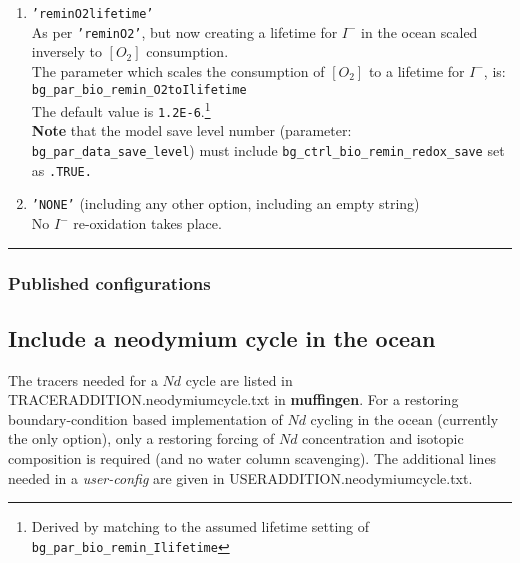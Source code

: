\begin{itemize}[noitemsep]
\begin{enumerate}[noitemsep]
\vspace{1mm}
\item \texttt{'reminO2lifetime'}
\vspace{1mm}
\\As per \texttt{'reminO2'}, but now creating a lifetime for \(I^{-}\) in the ocean scaled inversely to \([O_{2}]\) consumption.
\vspace{1mm}
\\The parameter which scales the consumption of \([O_{2}]\) to a lifetime for \(I^{-}\), is: \\\texttt{bg\_par\_bio\_remin\_O2toIlifetime}
\vspace{1mm}
\\The default value is \texttt{1.2E-6}.\footnote{Derived by matching to the assumed lifetime setting of \texttt{bg\_par\_bio\_remin\_Ilifetime}}
\vspace{1mm}
\\\textbf{Note} that the model save level number (parameter: \texttt{bg\_par\_data\_save\_level}) must include \texttt{bg\_ctrl\_bio\_remin\_redox\_save} set as \texttt{.TRUE.}

\vspace{1mm}
\item \texttt{'NONE'} (including any other option, including an empty string)
\vspace{1mm}
\\No \(I^{-}\) re-oxidation takes place.

\end{enumerate}


\end{itemize}


%
\noindent\rule{4cm}{0.5pt}
\subsubsection{Published configurations}
\vspace{1mm}

\noindent 



%
\newpage
\subsection*{Include a neodymium cycle in the ocean}
\vspace{1mm}

The tracers needed for a \(Nd\) cycle are listed in 
\textsf{\footnotesize TRACERADDITION.neodymiumcycle.txt} in \textbf{muffingen}. For a restoring boundary-condition based implementation of \(Nd\) cycling in the ocean (currently the only option), only a restoring forcing of \(Nd\) concentration and isotopic composition is required (and no water column scavenging). The additional lines needed in a \textit{user-config} are given in 
\textsf{\footnotesize USERADDITION.neodymiumcycle.txt}.

